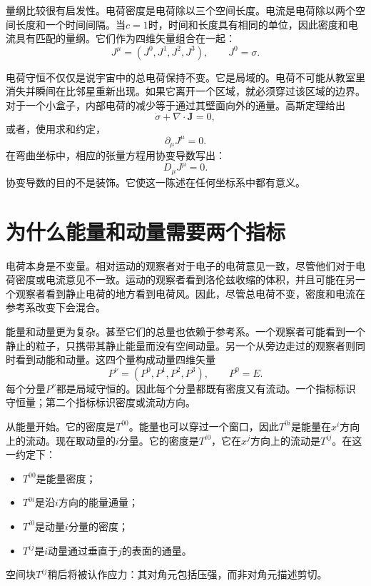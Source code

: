 量纲比较很有启发性。电荷密度是电荷除以三个空间长度。电流是电荷除以两个空间长度和一个时间间隔。当\(c=1\)时，时间和长度具有相同的单位，因此密度和电流具有匹配的量纲。它们作为四维矢量组合在一起：
\begin{equation}
 J^\mu=(J^0,J^1,J^2,J^3),
 \qquad J^0=\sigma.
\end{equation}

电荷守恒不仅仅是说宇宙中的总电荷保持不变。它是局域的。电荷不可能从教室里消失并瞬间在比邻星重新出现。如果它离开一个区域，就必须穿过该区域的边界。对于一个小盒子，内部电荷的减少等于通过其壁面向外的通量。高斯定理给出
\begin{equation}
 \dot{\sigma}+\nabla\cdot\mathbf{J}=0,
\end{equation}
或者，使用求和约定，
\begin{equation}
 \partial_\mu J^\mu=0.
 \label{eq:charge-continuity}
\end{equation}
在弯曲坐标中，相应的张量方程用协变导数写出：
\begin{equation}
 D_\mu J^\mu=0.
\end{equation}
协变导数的目的不是装饰。它使这一陈述在任何坐标系中都有意义。

\section{为什么能量和动量需要两个指标}

电荷本身是不变量。相对运动的观察者对于电子的电荷意见一致，尽管他们对于电荷密度或电流意见不一致。运动的观察者看到洛伦兹收缩的体积，并且可能在另一个观察者看到静止电荷的地方看到电荷风。因此，尽管总电荷不变，密度和电流在参考系改变下会混合。

能量和动量更为复杂。甚至它们的总量也依赖于参考系。一个观察者可能看到一个静止的粒子，只携带其静止能量而没有空间动量。另一个从旁边走过的观察者则同时看到动能和动量。这四个量构成动量四维矢量
\begin{equation}
 P^\nu=(P^0,P^1,P^2,P^3),
 \qquad P^0=E.
\end{equation}
每个分量\(P^\nu\)都是局域守恒的。因此每个分量都既有密度又有流动。一个指标标识守恒量；第二个指标标识密度或流动方向。

从能量开始。它的密度是\(T^{00}\)。能量也可以穿过一个窗口，因此\(T^{0i}\)是能量在\(x^i\)方向上的流动。现在取动量的\(i\)分量。它的密度是\(T^{i0}\)，它在\(x^j\)方向上的流动是\(T^{ij}\)。在这一约定下：
\begin{itemize}
 \item \(T^{00}\)是能量密度；
 \item \(T^{0i}\)是沿\(i\)方向的能量通量；
 \item \(T^{i0}\)是动量\(i\)分量的密度；
 \item \(T^{ij}\)是\(i\)动量通过垂直于\(j\)的表面的通量。
\end{itemize}
空间块\(T^{ij}\)稍后将被认作应力：其对角元包括压强，而非对角元描述剪切。

